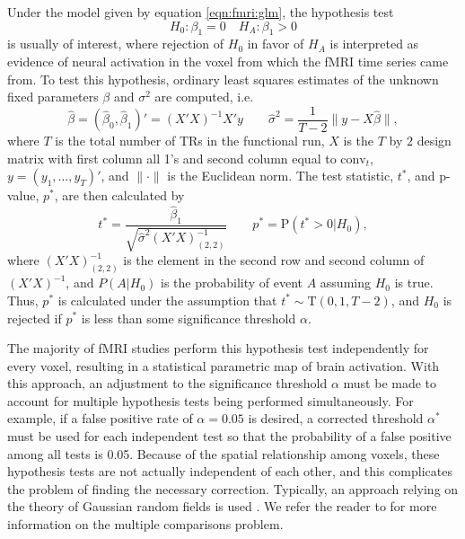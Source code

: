 Under the model given by equation \eqref{eqn:fmri:glm}, the hypothesis test
\begin{equation}
H_0: \beta_1 = 0 \quad H_A: \beta_1 > 0 \label{eqn:fmri:hyp}
\end{equation}
is usually of interest, where rejection of $H_0$ in favor of $H_A$ is interpreted as evidence of neural activation in the voxel from which the fMRI time series came from. To test this hypothesis, ordinary least squares estimates of the unknown fixed parameters $\beta$ and $\sigma^2$ are computed, i.e.
\begin{equation}
\hat{\beta}  = (\hat{\beta}_0,\hat{\beta}_1)' = (X'X)^{-1}X'y \qquad \hat{\sigma}^2 = \frac{1}{T-2}\lVert y-X\hat{\beta} \rVert, \label{eqn:fmri:ols}
\end{equation}
where $T$ is the total number of TRs in the functional run, $X$ is the $T$ by $2$ design matrix with first column all 1's and second column equal to $\mbox{conv}_t$, $y = (y_1,\ldots,y_T)'$, and $\lVert\cdot\rVert$ is the Euclidean norm. The test statistic, $t^*$, and p-value, $p^*$, are then calculated by
\begin{equation}
t^* = \frac{\hat{\beta}_1}{\sqrt{\hat{\sigma}^2(X'X)_{(2,2)}^{-1}}} \qquad p^* = \mbox{P}(t^* > 0|H_0), \label{eqn:fmri:ttest}
\end{equation}
where $(X'X)_{(2,2)}^{-1}$ is the element in the second row and second column of $(X'X)^{-1}$, and $P(A|H_0)$ is the probability of event $A$ assuming $H_0$ is true. Thus, $p^*$ is calculated under the assumption that $t^* \sim \mbox{T}(0,1,T-2)$, and $H_0$ is rejected if $p^*$ is less than some significance threshold $\alpha$.

The majority of fMRI studies perform this hypothesis test independently for every voxel, resulting in a statistical parametric map of brain activation. With this approach, an adjustment to the significance threshold $\alpha$ must be made to account for multiple hypothesis tests being performed simultaneously. For example, if a false positive rate of $\alpha = 0.05$ is desired, a corrected threshold $\alpha^*$ must be used for each independent test so that the probability of a false positive among all tests is 0.05. Because of the spatial relationship among voxels, these hypothesis tests are not actually independent of each other, and this complicates the problem of finding the necessary correction. Typically, an approach relying on the theory of Gaussian random fields is used \citep{wors:grf:1995,wors:mar:cerebral:1996,wors:evans:cerebral:1992,friston:frith:JCBFM:1991}. We refer the reader to \citet[Chapter 6,][]{ashby:fmri:2011} for more information on the multiple comparisons problem.


